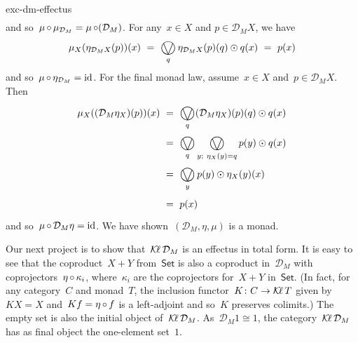 \begin{solution}{exc-dm-effectus}
\begin{align*}
\end{align*}
    and so~$\mu \mathop{\circ} \mu_{\mathcal{D}_M} = \mu \mathop{\circ} (\mathcal{D}_M )$.
For any~$x \in X$ and $p \in \mathcal{D}_M X$, we have
\begin{equation*}
    \mu_X (\eta_{\mathcal{D}_M X}(p))(x)
    \ = \ \bigovee_q \eta_{\mathcal{D}_M X}(p)(q) \odot q(x) \ = \ p(x)
\end{equation*}
and so~$\mu \mathop{\circ} \eta_{\mathcal{D}_M} = \mathrm{id}$.
For the final monad law, assume~$x \in X$ and~$p \in \mathcal{D}_M X$.
Then
\begin{align*}
    \mu_X( (\mathcal{D}_M \eta_X)(p))(x)
    & \ = \ \bigovee_q (\mathcal{D}_M \eta_X) (p)(q) \odot q(x) \\
    & \ = \ \bigovee_q \bigovee_{y; \ \eta_X(y)=q}
            p(y) \odot q(x) \\
    & \ = \ \bigovee_y p(y) \odot \eta_X (y)(x) \\
    & \ = \ p(x)
\end{align*}
and so~$\mu \mathop{\circ} \mathcal{D}_M \eta = \mathrm{id}$.
We have shown~$(\mathcal{D}_M, \eta, \mu)$ is a monad.

Our next project is to show that~$\operatorname{\mathcal{K}\!\ell} \mathcal{D}_M$ is an effectus
    in total form.
It is easy to see that the coproduct~$X + Y$ from~$\mathsf{Set}$
    is also a coproduct in~$\mathcal{D}_M$
        with coprojectors~$\eta\mathop{\circ}\kappa_i$,
            where~$\kappa_i$ are the coprojectors for~$X+Y$ in~$\mathsf{Set}$.
(In fact, for any category~$C$ and monad~$T$,
    the inclusion functor~$K\colon C \to \operatorname{\mathcal{K}\!\ell} T$
        given by~$K X = X$ and~$K f = \eta \mathop{\circ} f$
        is a left-adjoint and so~$K$ preserves colimits.)
The empty set is also the initial object of~$\operatorname{\mathcal{K}\!\ell} \mathcal{D}_M$.
As~$\mathcal{D}_M 1 \cong 1$,
    the category~$\operatorname{\mathcal{K}\!\ell} \mathcal{D}_M$
        has as final object the one-element set~$1$.


\end{solution}
